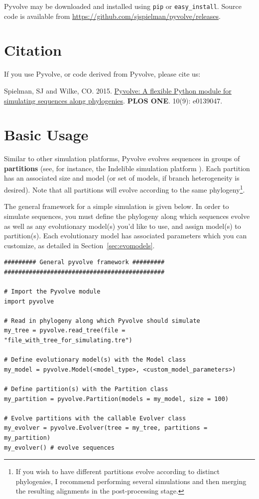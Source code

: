 \documentclass{article}
\newcommand{\code}[1]{\texttt{\small{#1}}}
\begin{document}
Pyvolve may be downloaded and installed using \code{pip} or \code{easy\_install}. Source code is available from \href{https://github.com/sjspielman/pyvolve/releases}{https://github.com/sjspielman/pyvolve/releases}.

\section{Citation}

If you use Pyvolve, or code derived from Pyvolve, please cite us:

Spielman, SJ and Wilke, CO. 2015. \href{http://journals.plos.org/plosone/article?id=10.1371/journal.pone.0139047}{Pyvolve: A flexible Python module for simulating sequences along phylogenies}. \textbf{PLOS ONE}. 10(9): e0139047.


\section{Basic Usage}

Similar to other simulation platforms, Pyvolve evolves sequences in groups of \textbf{partitions} (see, for instance, the Indelible simulation platform \citep{Fletcher2009}). Each partition has an associated size and model (or set of models, if branch heterogeneity is desired). Note that all partitions will evolve according to the same phylogeny\footnote{If you wish to have different partitions evolve according to distinct phylogenies, I recommend performing several simulations and then merging the resulting alignments in the post-processing stage.}. 

The general framework for a simple simulation is given below. In order to simulate sequences, you must define the phylogeny along which sequences evolve as well as any evolutionary model(s) you'd like to use, and assign model(s) to partition(s). Each evolutionary model has associated parameters which you can customize, as detailed in Section~\ref{sec:evomodels}.

\begin{lstlisting}
######### General pyvolve framework #########
#############################################

# Import the Pyvolve module
import pyvolve

# Read in phylogeny along which Pyvolve should simulate
my_tree = pyvolve.read_tree(file = "file_with_tree_for_simulating.tre")

# Define evolutionary model(s) with the Model class
my_model = pyvolve.Model(<model_type>, <custom_model_parameters>)

# Define partition(s) with the Partition class
my_partition = pyvolve.Partition(models = my_model, size = 100)

# Evolve partitions with the callable Evolver class
my_evolver = pyvolve.Evolver(tree = my_tree, partitions = my_partition)
my_evolver() # evolve sequences
\end{lstlisting}
\end{document}
